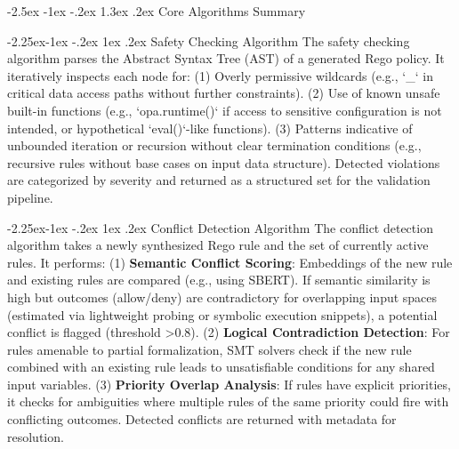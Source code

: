 \documentclass[manuscript,screen,review,anonymous,9pt]{acmart}
\makeatletter
\renewcommand\section{\@startsection{section}{1}{\z@}%
  {-2.5ex \@plus -1ex \@minus -.2ex}%
  {1.3ex \@plus.2ex}%
  {\normalfont\Large\bfseries}}
\renewcommand\subsection{\@startsection{subsection}{2}{\z@}%
  {-2.25ex\@plus -1ex \@minus -.2ex}%
  {1ex \@plus .2ex}%
  {\normalfont\large\bfseries}}
\makeatother
\begin{document}
\section{Core Algorithms Summary}
\label{app:algorithms}

\subsection{Safety Checking Algorithm}
The safety checking algorithm parses the Abstract Syntax Tree (AST) of a generated Rego policy. It iteratively inspects each node for: (1) Overly permissive wildcards (e.g., `_` in critical data access paths without further constraints). (2) Use of known unsafe built-in functions (e.g., `opa.runtime()` if access to sensitive configuration is not intended, or hypothetical `eval()`-like functions). (3) Patterns indicative of unbounded iteration or recursion without clear termination conditions (e.g., recursive rules without base cases on input data structure). Detected violations are categorized by severity and returned as a structured set for the validation pipeline.

\subsection{Conflict Detection Algorithm}
The conflict detection algorithm takes a newly synthesized Rego rule and the set of currently active rules. It performs: (1) \textbf{Semantic Conflict Scoring}: Embeddings of the new rule and existing rules are compared (e.g., using SBERT). If semantic similarity is high but outcomes (allow/deny) are contradictory for overlapping input spaces (estimated via lightweight probing or symbolic execution snippets), a potential conflict is flagged (threshold >0.8). (2) \textbf{Logical Contradiction Detection}: For rules amenable to partial formalization, SMT solvers check if the new rule combined with an existing rule leads to unsatisfiable conditions for any shared input variables. (3) \textbf{Priority Overlap Analysis}: If rules have explicit priorities, it checks for ambiguities where multiple rules of the same priority could fire with conflicting outcomes. Detected conflicts are returned with metadata for resolution.
\end{document}
